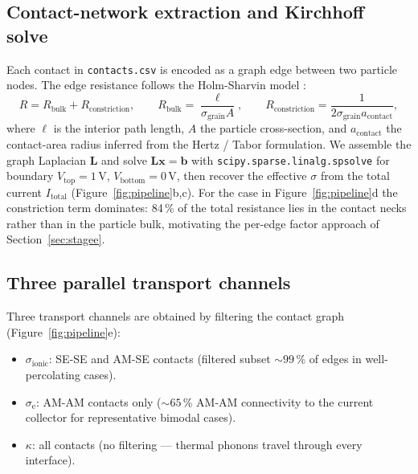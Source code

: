 \documentclass[11pt, a4paper]{article}
\newcommand{\sigmaionic}{\ensuremath{\sigma_{\mathrm{ionic}}}}
\newcommand{\sigmae}{\ensuremath{\sigma_{\mathrm{e}}}}
\newcommand{\sigmagrain}{\ensuremath{\sigma_{\mathrm{grain}}}}
\newcommand{\Rbulk}{\ensuremath{R_{\mathrm{bulk}}}}
\newcommand{\Rconst}{\ensuremath{R_{\mathrm{constriction}}}}
\begin{document}
\subsection{Contact-network extraction and Kirchhoff solve}
\label{sec:methods-network}


Each contact in \texttt{contacts.csv} is encoded as a graph edge
between two particle nodes. The edge resistance follows the
Holm-Sharvin model \citep{Holm1967}:
\begin{equation}
R = \Rbulk + \Rconst,
\qquad
\Rbulk = \frac{\ell}{\sigmagrain A},
\qquad
\Rconst = \frac{1}{2 \sigmagrain a_{\mathrm{contact}}},
\label{eq:Rsplit}
\end{equation}
where $\ell$ is the interior path length, $A$ the particle
cross-section, and $a_{\mathrm{contact}}$ the contact-area radius
inferred from the Hertz / Tabor formulation. We assemble the graph
Laplacian $\mathbf{L}$ and solve $\mathbf{L}\mathbf{x}=\mathbf{b}$
with \texttt{scipy.sparse.linalg.spsolve} for boundary $V_{\mathrm{top}}
= 1$\,V, $V_{\mathrm{bottom}} = 0$\,V, then recover the effective
$\sigma$ from the total current $I_{\mathrm{total}}$
(Figure~\ref{fig:pipeline}b,c). For the case in
Figure~\ref{fig:pipeline}d the constriction term dominates: 84\,\% of
the total resistance lies in the contact necks rather than in the
particle bulk, motivating the per-edge factor approach of
Section~\ref{sec:stagee}.

\subsection{Three parallel transport channels}
\label{sec:methods-three}

Three transport channels are obtained by filtering the contact
graph (Figure~\ref{fig:pipeline}e):
\begin{itemize}
\item $\sigmaionic$: SE-SE and AM-SE contacts (filtered subset $\sim 99$\,\%
      of edges in well-percolating cases).
\item $\sigmae$: AM-AM contacts only ($\sim 65$\,\% AM-AM connectivity to
      the current collector for representative bimodal cases).
\item $\kappa$: all contacts (no filtering --- thermal phonons travel
      through every interface).
\end{itemize}
\end{document}
